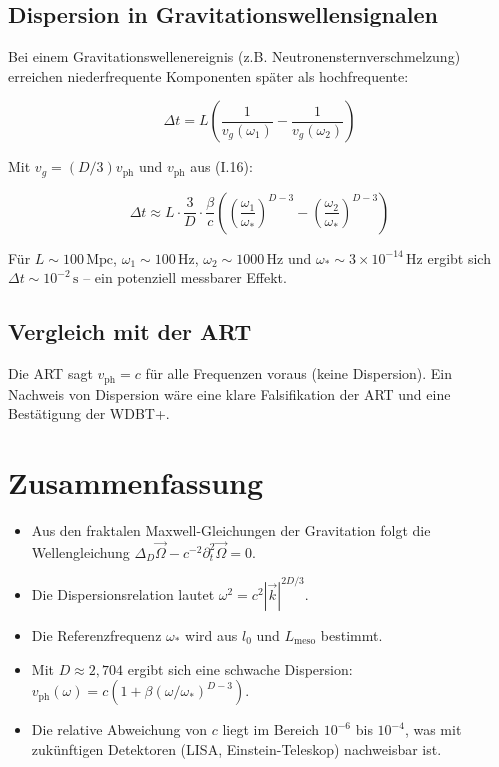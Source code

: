 \subsection{Dispersion in Gravitationswellensignalen}

Bei einem Gravitationswellenereignis (z.B. Neutronensternverschmelzung) erreichen 
niederfrequente Komponenten später als hochfrequente:

\[
\Delta t = L \left( \frac{1}{v_g(\omega_1)} - \frac{1}{v_g(\omega_2)} \right)
\]

Mit $v_g = (D/3) v_{\text{ph}}$ und $v_{\text{ph}}$ aus (I.16):

\[
\Delta t \approx L \cdot \frac{3}{D} \cdot \frac{\beta}{c} \left( \left( \frac{\omega_1}{\omega_*} \right)^{D-3} - \left( \frac{\omega_2}{\omega_*} \right)^{D-3} \right) \tag{I.18}
\]

Für $L \sim 100\,\text{Mpc}$, $\omega_1 \sim 100\,\text{Hz}$, $\omega_2 \sim 1000\,\text{Hz}$
und $\omega_* \sim 3 \times 10^{-14}\,\text{Hz}$ ergibt sich $\Delta t \sim 10^{-2}\,\text{s}$ 
– ein potenziell messbarer Effekt.

\subsection{Vergleich mit der ART}

Die ART sagt $v_{\text{ph}} = c$ für alle Frequenzen voraus (keine Dispersion). 
Ein Nachweis von Dispersion wäre eine klare Falsifikation der ART und eine 
Bestätigung der WDBT+.

\section{Zusammenfassung}

\begin{itemize}
    \item Aus den fraktalen Maxwell-Gleichungen der Gravitation folgt die Wellengleichung 
          $\Delta_D \vec{\Omega} - c^{-2} \partial_t^2 \vec{\Omega} = 0$.
    \item Die Dispersionsrelation lautet $\omega^2 = c^2 |\vec{k}|^{2D/3}$.
    \item Die Referenzfrequenz $\omega_*$ wird aus $l_0$ und $L_{\text{meso}}$ bestimmt.
    \item Mit $D \approx 2,704$ ergibt sich eine schwache Dispersion: 
          $v_{\text{ph}}(\omega) = c (1 + \beta (\omega/\omega_*)^{D-3})$.
    \item Die relative Abweichung von $c$ liegt im Bereich $10^{-6}$ bis $10^{-4}$, 
          was mit zukünftigen Detektoren (LISA, Einstein-Teleskop) nachweisbar ist.
\end{itemize}